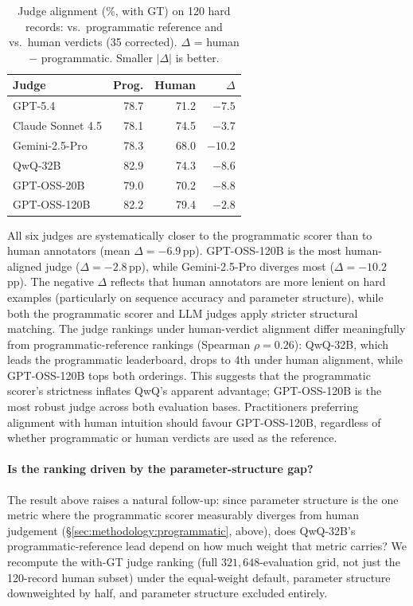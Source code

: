 \begin{table}[!htbp]
\centering
\small
\setlength{\tabcolsep}{5pt}
\renewcommand{\arraystretch}{1.05}
\begin{tabular}{@{}lrrr@{}}
\toprule
\textbf{Judge} & \textbf{Prog.} & \textbf{Human} & $\Delta$ \\
\midrule
GPT-5.4         & 78.7 & 71.2 & $-7.5$ \\
Claude Sonnet 4.5          & 78.1 & 74.5 & $-3.7$ \\
Gemini-2.5-Pro  & 78.3 & 68.0 & $-10.2$ \\
QwQ-32B         & 82.9 & 74.3 & $-8.6$ \\
GPT-OSS-20B     & 79.0 & 70.2 & $-8.8$ \\
GPT-OSS-120B    & 82.2 & 79.4 & $-2.8$ \\
\bottomrule
\end{tabular}
\caption{Judge alignment (\%, with GT) on 120 hard records: vs.\ programmatic reference and vs.\ human verdicts (35 corrected). $\Delta$ = human $-$ programmatic. Smaller $|\Delta|$ is better.}
\label{tab:judge-vs-human}
\end{table}

All six judges are systematically closer to the programmatic scorer than to human annotators (mean $\Delta = -6.9$\,pp). GPT-OSS-120B is the most human-aligned judge ($\Delta = -2.8$\,pp), while Gemini-2.5-Pro diverges most ($\Delta = -10.2$\,pp). The negative $\Delta$ reflects that human annotators are more lenient on hard examples (particularly on sequence accuracy and parameter structure), while both the programmatic scorer and LLM judges apply stricter structural matching. The judge rankings under human-verdict alignment differ meaningfully from programmatic-reference rankings (Spearman $\rho = 0.26$): QwQ-32B, which leads the programmatic leaderboard, drops to 4th under human alignment, while GPT-OSS-120B tops both orderings. This suggests that the programmatic scorer's strictness inflates QwQ's apparent advantage; GPT-OSS-120B is the most robust judge across both evaluation bases. Practitioners preferring alignment with human intuition should favour GPT-OSS-120B, regardless of whether programmatic or human verdicts are used as the reference.

\paragraph{Is the ranking driven by the parameter-structure gap?}
The result above raises a natural follow-up: since parameter structure is the one metric where the programmatic scorer measurably diverges from human judgement (\S\ref{sec:methodology:programmatic}, above), does QwQ-32B's programmatic-reference lead depend on how much weight that metric carries? We recompute the with-GT judge ranking (full $321{,}648$-evaluation grid, not just the 120-record human subset) under the equal-weight default, parameter structure downweighted by half, and parameter structure excluded entirely.

